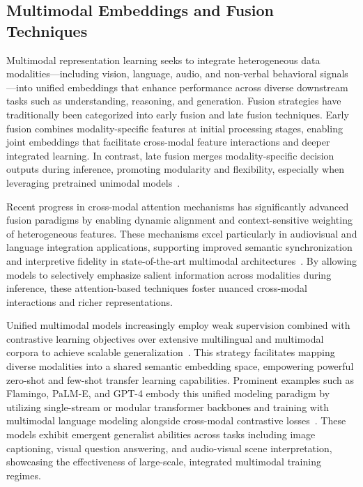 \documentclass[sigconf]{acmart}
\begin{document}
\subsection{Multimodal Embeddings and Fusion Techniques}

Multimodal representation learning seeks to integrate heterogeneous data modalities—including vision, language, audio, and non-verbal behavioral signals—into unified embeddings that enhance performance across diverse downstream tasks such as understanding, reasoning, and generation. Fusion strategies have traditionally been categorized into early fusion and late fusion techniques. Early fusion combines modality-specific features at initial processing stages, enabling joint embeddings that facilitate cross-modal feature interactions and deeper integrated learning. In contrast, late fusion merges modality-specific decision outputs during inference, promoting modularity and flexibility, especially when leveraging pretrained unimodal models~\cite{ref1,ref2}.

Recent progress in cross-modal attention mechanisms has significantly advanced fusion paradigms by enabling dynamic alignment and context-sensitive weighting of heterogeneous features. These mechanisms excel particularly in audiovisual and language integration applications, supporting improved semantic synchronization and interpretive fidelity in state-of-the-art multimodal architectures~\cite{ref3,ref4,ref5,ref12,ref32}. By allowing models to selectively emphasize salient information across modalities during inference, these attention-based techniques foster nuanced cross-modal interactions and richer representations.

Unified multimodal models increasingly employ weak supervision combined with contrastive learning objectives over extensive multilingual and multimodal corpora to achieve scalable generalization~\cite{ref28,ref31}. This strategy facilitates mapping diverse modalities into a shared semantic embedding space, empowering powerful zero-shot and few-shot transfer learning capabilities. Prominent examples such as Flamingo, PaLM-E, and GPT-4 embody this unified modeling paradigm by utilizing single-stream or modular transformer backbones and training with multimodal language modeling alongside cross-modal contrastive losses~\cite{ref6}. These models exhibit emergent generalist abilities across tasks including image captioning, visual question answering, and audio-visual scene interpretation, showcasing the effectiveness of large-scale, integrated multimodal training regimes.
\end{document}
